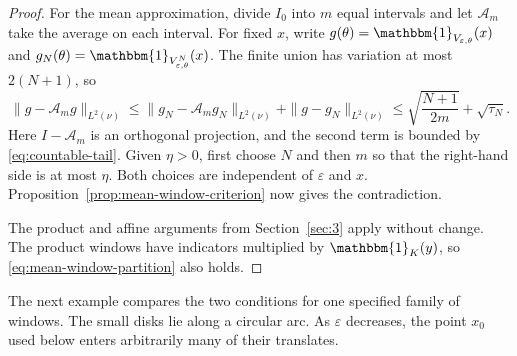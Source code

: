 \documentclass[12pt,reqno,tbtags]{amsart}
\newcommand\norm[1]{\|#1\|}
\newcommand\1{\mathbbm{1}}
\newcommand{\eps}{\varepsilon}
\begin{document}
\begin{proof}
For the mean approximation, divide $I_0$ into
$m$ equal intervals and let $\mathcal A_m$ take the average on each interval.
For fixed $x$, write
$g(\theta)=\1_{V_{\eps,\theta}}(x)$ and
$g_N(\theta)=\1_{V^N_{\eps,\theta}}(x)$.
The finite union has variation at most $2(N+1)$, so
\begin{equation}\label{eq:countable-mean-approximation}
    \norm{g-\mathcal A_m g}_{L^2(\nu)}
    \le\norm{g_N-\mathcal A_m g_N}_{L^2(\nu)}
       +\norm{g-g_N}_{L^2(\nu)}
    \le\sqrt{\frac{N+1}{2m}}+\sqrt{\tau_N}.
\end{equation}
Here $I-\mathcal A_m$ is an orthogonal projection, and the second term is
bounded by \eqref{eq:countable-tail}. Given $\eta>0$, first choose $N$ and
then $m$ so that the right-hand side is at most $\eta$.
Both choices are independent of $\eps$ and $x$.
Proposition~\ref{prop:mean-window-criterion} now gives the contradiction.

The product and affine arguments from Section~\ref{sec:3} apply without change.
The product windows have indicators multiplied by $\1_K(y)$,
so \eqref{eq:mean-window-partition} also holds.
\end{proof}

The next example compares the two conditions for one specified family of
windows. The small disks lie along a circular arc. As $\eps$ decreases,
the point $x_0$ used below enters arbitrarily many of their translates.
\end{document}
